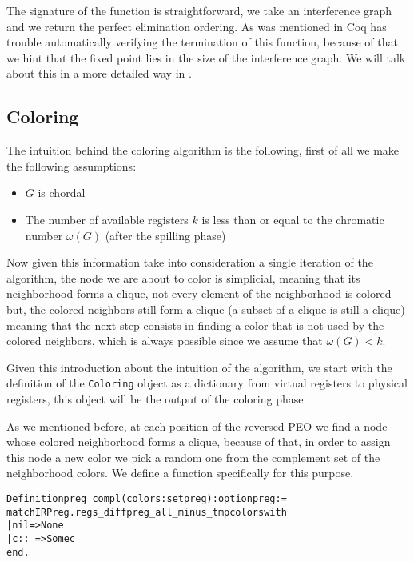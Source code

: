 The signature of the function is straightforward, we take an interference graph and we return the perfect elimination ordering.
As was mentioned in  Coq has trouble automatically verifying the termination of this function, because of that we hint that the fixed point lies in the size of the interference graph. We will talk about this in a more detailed way in .

\subsection{Coloring}
\label{subsec:coloring}

The intuition behind the coloring algorithm is the following, first of all we make the following assumptions:

\begin{itemize}
  \item $G$ is chordal
  \item The number of available registers $k$ is less than or equal to the chromatic number $\omega(G)$ (after the spilling phase)
\end{itemize}

Now given this information take into consideration a single iteration of the algorithm, the node we are about to color is simplicial, meaning that its neighborhood forms a clique, not every element of the neighborhood is colored but, the colored neighbors still form a clique (a subset of a clique is still a clique) meaning that the next step consists in finding a color that is not used by the colored neighbors, which is always possible since we assume that $\omega(G) < k$.

Given this introduction about the intuition of the algorithm, we start with the definition of the \texttt{Coloring} object as a dictionary from virtual registers to physical registers, this object will be the output of the coloring phase.

As we mentioned before, at each position of the \textit reversed PEO we find a node whose colored neighborhood forms a clique, because of that, in order to assign this node a new color we pick a random one from the complement set of the neighborhood colors. We define a function specifically for this purpose.

\begin{alltt}
Definition preg_compl (colors : set preg) : option preg :=
  match IRPreg.regs_diff preg_all_minus_tmp colors with
  | nil => None
  | c :: _ => Some c
  end.
\end{alltt}

